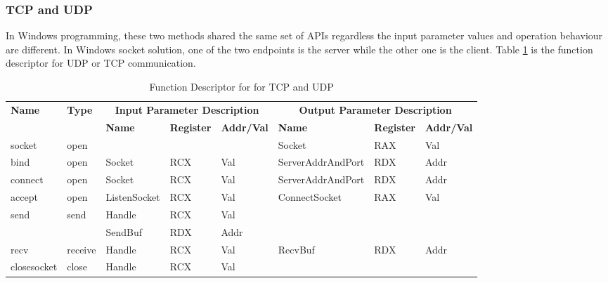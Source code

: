     
\subsubsection{TCP and UDP}
In Windows programming, these two methods shared the same set of APIs regardless the input parameter values and operation behaviour are different. In Windows socket solution, one of the two endpoints is the server while the other one is the client. Table \ref{tcpupdfunctions} is the function descriptor for UDP or TCP communication. 

\begin{table}[H]
  \centering
  \caption{Function Descriptor for for TCP and UDP}
  \label{tcpupdfunctions}
\begin{tabular}{|l|l|l|l|l|l|l|l|}
\hline
             \multirow{2}{*}{{\textbf{Name}}} & \multirow{2}{*}{{\textbf{Type}}} & \multicolumn{3}{c|}{\textbf{Input Parameter Description}} & \multicolumn{3}{c|}{\textbf{Output Parameter Description}} \\
              \cline{3-8} 
             & & \textbf{Name}& \textbf{Register} & \textbf{Addr/Val} & \textbf{Name}& \textbf{Register} &  \textbf{Addr/Val}  \\
             \hline
      socket
       &open &  &   &  &  Socket & RAX & Val\\
      \hline
      bind
       &open & Socket &  RCX & Val &  ServerAddrAndPort & RDX & Addr\\
      \hline   
            connect
       &open & Socket &  RCX & Val &  ServerAddrAndPort & RDX & Addr\\
      \hline   
     accept
       &open &  ListenSocket & RCX & Val & ConnectSocket & RAX & Val\\
      \hline                    
      \multirow{2}{*}{send}
       &\multirow{2}{*}{send} &  Handle & RCX & Val &  &  & \\
       \cline{3-5}
      & & SendBuf& RDX&Addr &  &  & \\
      \hline            
      recv
       &receive&  Handle & RCX & Val& RecvBuf& RDX&Addr\\
      \hline      
      closesocket &
       close &  Handle & RCX & Val & & &\\
      \hline                          
  \end{tabular}    
\end{table}

